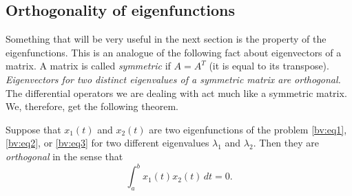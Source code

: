 \subsection{Orthogonality of eigenfunctions}

Something that will be very useful in the next section is the
\emph{} property of the eigenfunctions. This is an analogue
of the following fact about eigenvectors of a matrix.  A matrix is
called
\emph{symmetric}
if $A = A^T$ (it is equal to its transpose).
\emph{Eigenvectors for two distinct eigenvalues of a symmetric
matrix are orthogonal.}
The
differential operators we are dealing with act much like a symmetric matrix.
We, therefore, get the following theorem.

%
%
%

\begin{theorem} \label{bvp:orthogonaleigen}
Suppose that $x_1(t)$ and $x_2(t)$ are two eigenfunctions of the problem
\eqref{bv:eq1}, \eqref{bv:eq2}, or \eqref{bv:eq3}
for two different
eigenvalues $\lambda_1$ and $\lambda_2$.  Then they are
\emph{orthogonal}
in the sense that
\begin{equation*}
\int_a^b x_1(t) x_2(t) \,dt = 0 .
\end{equation*}
\end{theorem}

